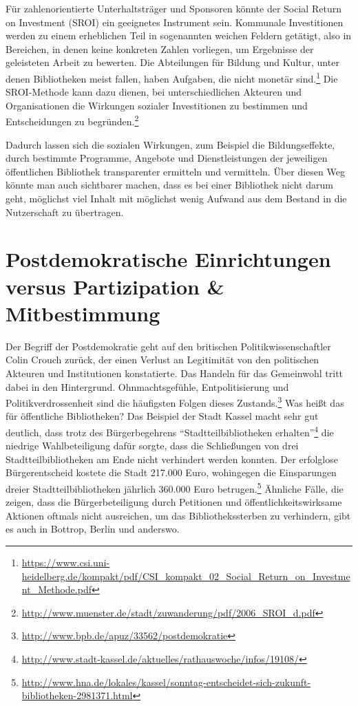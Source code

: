 \documentclass[a4paper,
fontsize=11pt,
oneside,
numbers=noperiodatend,
parskip=half-,
bibliography=totoc,
final
]{scrartcl}
\begin{document}
Für zahlenorientierte Unterhaltsträger und Sponsoren könnte der Social
Return on Investment (SROI) ein geeignetes Instrument sein. Kommunale
Investitionen werden zu einem erheblichen Teil in sogenannten weichen
Feldern getätigt, also in Bereichen, in denen keine konkreten Zahlen
vorliegen, um Ergebnisse der geleisteten Arbeit zu bewerten. Die
Abteilungen für Bildung und Kultur, unter denen Bibliotheken meist
fallen, haben Aufgaben, die nicht monetär sind.\footnote{\url{https://www.csi.uni-heidelberg.de/kompakt/pdf/CSI\_kompakt\_02\_Social\_Return\_on\_Investment\_Methode.pdf}}
Die SROI-Methode kann dazu dienen, bei unterschiedlichen Akteuren und
Organisationen die Wirkungen sozialer Investitionen zu bestimmen und
Entscheidungen zu begründen.\footnote{\url{http://www.muenster.de/stadt/zuwanderung/pdf/2006\_SROI\_d.pdf}}

Dadurch lassen sich die sozialen Wirkungen, zum Beispiel die
Bildungseffekte, durch bestimmte Programme, Angebote und
Dienstleistungen der jeweiligen öffentlichen Bibliothek transparenter
ermitteln und vermitteln. Über diesen Weg könnte man auch sichtbarer
machen, dass es bei einer Bibliothek nicht darum geht, möglichst viel
Inhalt mit möglichst wenig Aufwand aus dem Bestand in die Nutzerschaft
zu übertragen.

\section{Postdemokratische Einrichtungen versus Partizipation \&
Mitbestimmung}\label{postdemokratische-einrichtungen-versus-partizipation-mitbestimmung}

Der Begriff der Postdemokratie geht auf den britischen
Politikwissenschaftler Colin Crouch zurück, der einen Verlust an
Legitimität von den politischen Akteuren und Institutionen konstatierte.
Das Handeln für das Gemeinwohl tritt dabei in den Hintergrund.
Ohnmachtsgefühle, Entpolitisierung und Politikverdrossenheit sind die
häufigsten Folgen dieses Zustands.\footnote{\url{http://www.bpb.de/apuz/33562/postdemokratie}}
Was heißt das für öffentliche Bibliotheken? Das Beispiel der Stadt
Kassel macht sehr gut deutlich, dass trotz des Bürgerbegehrens
\enquote{Stadtteilbibliotheken erhalten}\footnote{\url{http://www.stadt-kassel.de/aktuelles/rathauswoche/infos/19108/}}
die niedrige Wahlbeteiligung dafür sorgte, dass die Schließungen von
drei Stadtteilbibliotheken am Ende nicht verhindert werden konnten. Der
erfolglose Bürgerentscheid kostete die Stadt 217.000 Euro, wohingegen
die Einsparungen dreier Stadtteilbibliotheken jährlich 360.000 Euro
betrugen.\footnote{\url{http://www.hna.de/lokales/kassel/sonntag-entscheidet-sich-zukunft-bibliotheken-2981371.html}}
Ähnliche Fälle, die zeigen, dass die Bürgerbeteiligung durch Petitionen
und öffentlichkeitswirksame Aktionen oftmals nicht ausreichen, um das
Bibliothekssterben zu verhindern, gibt es auch in Bottrop, Berlin und
anderswo.
\end{document}
